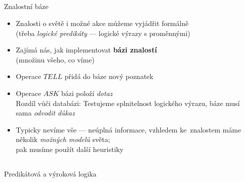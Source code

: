 \documentclass{beamer}
\begin{document}
\subsection{}
\begin{frame}{Znalostní báze}
\begin{itemize}
\item Znalosti o světě i možné akce můžeme vyjádřit formálně \\ (třeba {\em logické predikáty} --- logické výrazy s proměnnými)
\item Zajímá nás, jak implementovat {\bf bázi znalostí} \\ (množinu všeho, co víme)
\item Operace $TELL$ přidá do báze nový poznatek
\item Operace $ASK$ bázi položí {\em dotaz} \\ Rozdíl vůči databázi: Testujeme splnitelnost logického výrazu, báze musí sama {\em odvodit důkaz}
\item Typicky nevíme vše --- neúplná informace, vzhledem ke~znalostem máme několik {\em možných modelů} světa; \\ pak musíme použít další heuristiky
\end{itemize}
\end{frame}

\subsection{}
\begin{frame}{Predikátová a výroková logika}
\end{frame}
\end{document}
